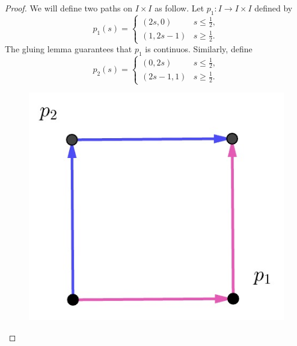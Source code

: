 \documentclass[12pt, a4paper]{article}
\theoremstyle{plain}
\begin{document}
    \begin{proof}
        We will define two paths on $I\times I$ as follow. Let $p_1\colon I\to I\times I$ defined by
        \[
        p_1(s) = \begin{cases}
            (2s,0) & s\leq \frac{1}{2},\\
            (1,2s-1) & s\geq \frac{1}{2}.
        \end{cases}
        \]
        The gluing lemma guarantees that $p_1$ is continuos. Similarly, define 
        \[
        p_2(s) = \begin{cases}
            (0,2s) & s\leq \frac{1}{2},\\
            (2s-1,1) & s\geq \frac{1}{2}.
        \end{cases}
        \]
        \begin{figure}[h]
            \centering
            \includegraphics[scale = 0.3]{Topology-Lee/image6.jpg}
        \end{figure}


\end{proof}
\end{document}
